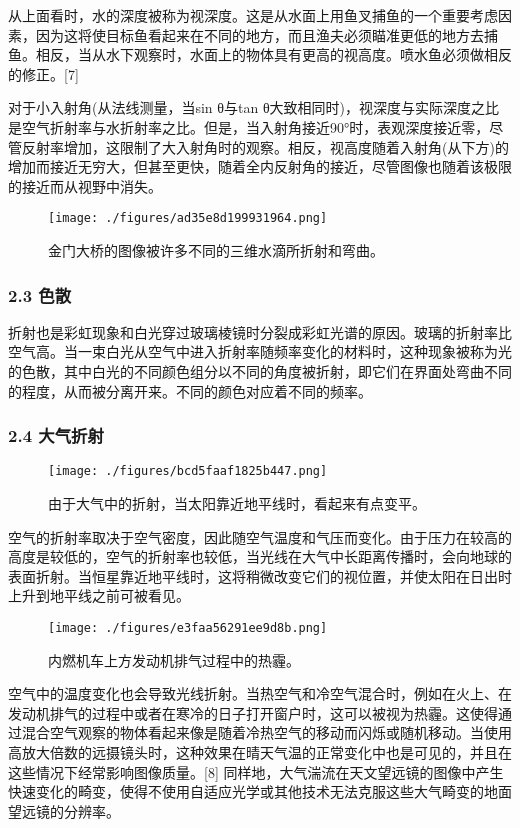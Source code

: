 从上面看时，水的深度被称为视深度。这是从水面上用鱼叉捕鱼的一个重要考虑因素，因为这将使目标鱼看起来在不同的地方，而且渔夫必须瞄准更低的地方去捕鱼。相反，当从水下观察时，水面上的物体具有更高的视高度。喷水鱼必须做相反的修正。[7]

对于小入射角(从法线测量，当sin θ与tan θ大致相同时)，视深度与实际深度之比是空气折射率与水折射率之比。但是，当入射角接近90°时，表观深度接近零，尽管反射率增加，这限制了大入射角时的观察。相反，视高度随着入射角(从下方)的增加而接近无穷大，但甚至更快，随着全内反射角的接近，尽管图像也随着该极限的接近而从视野中消失。

\begin{figure}[ht]
\centering
\texttt{[image: ./figures/ad35e8d199931964.png]}
\caption{金门大桥的图像被许多不同的三维水滴所折射和弯曲。} \label{fig_ZS_5}
\end{figure}

\subsubsection{2.3 色散}

折射也是彩虹现象和白光穿过玻璃棱镜时分裂成彩虹光谱的原因。玻璃的折射率比空气高。当一束白光从空气中进入折射率随频率变化的材料时，这种现象被称为光的色散，其中白光的不同颜色组分以不同的角度被折射，即它们在界面处弯曲不同的程度，从而被分离开来。不同的颜色对应着不同的频率。

\subsubsection{2.4 大气折射}

\begin{figure}[ht]
\centering
\texttt{[image: ./figures/bcd5faaf1825b447.png]}
\caption{由于大气中的折射，当太阳靠近地平线时，看起来有点变平。} \label{fig_ZS_6}
\end{figure}

空气的折射率取决于空气密度，因此随空气温度和气压而变化。由于压力在较高的高度是较低的，空气的折射率也较低，当光线在大气中长距离传播时，会向地球的表面折射。当恒星靠近地平线时，这将稍微改变它们的视位置，并使太阳在日出时上升到地平线之前可被看见。

\begin{figure}[ht]
\centering
\texttt{[image: ./figures/e3faa56291ee9d8b.png]}
\caption{内燃机车上方发动机排气过程中的热霾。} \label{fig_ZS_7}
\end{figure}

空气中的温度变化也会导致光线折射。当热空气和冷空气混合时，例如在火上、在发动机排气的过程中或者在寒冷的日子打开窗户时，这可以被视为热霾。这使得通过混合空气观察的物体看起来像是随着冷热空气的移动而闪烁或随机移动。当使用高放大倍数的远摄镜头时，这种效果在晴天气温的正常变化中也是可见的，并且在这些情况下经常影响图像质量。[8] 同样地，大气湍流在天文望远镜的图像中产生快速变化的畸变，使得不使用自适应光学或其他技术无法克服这些大气畸变的地面望远镜的分辨率。

